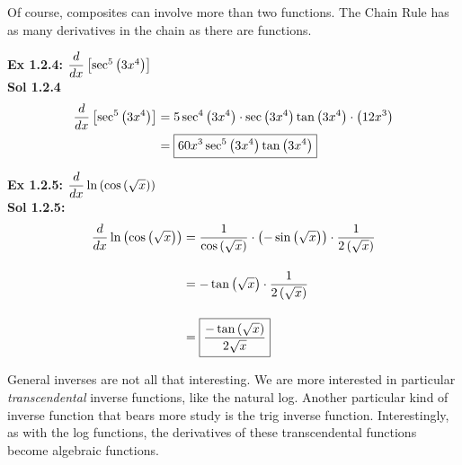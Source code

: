 Of course, composites can involve more than two functions. The Chain Rule has as many derivatives in the chain as there are functions. \par

\textbf{Ex 1.2.4: } $\dfrac{d}{dx} \left[\sec^5 \left(3x^4\right)\right]$ \\[11pt]
\textbf{Sol 1.2.4 } \begin{align*}
    \dfrac{d}{dx} \left[\sec^5 \left(3x^4\right)\right] & = 5\sec^4 \left(3x^4\right) \cdot \sec \left(3x^4\right) \tan \left(3x^4\right) \cdot \left(12x^3\right) \\
    & = \boxed{60x^3\sec^5 \left(3x^4\right)\tan \left(3x^4\right)}
\end{align*}

\textbf{Ex 1.2.5: } $\dfrac{d}{dx} \ln \left(\cos \left(\sqrt{x}\right)\right)$ \\[11pt]
\textbf{Sol 1.2.5: } \begin{align*}
    \dfrac{d}{dx} \ln \left(\cos \left(\sqrt{x}\right)\right) & = \dfrac{1}{\cos \left(\sqrt{x}\right)} \cdot \left(-\sin \left(\sqrt{x}\right)\right) \cdot \dfrac{1}{2\left(\sqrt{x}\right)} \\[11pt]
    & = -\tan \left(\sqrt{x}\right) \cdot \dfrac{1}{2\left(\sqrt{x}\right)} \\[11pt]
    & = \boxed{\dfrac{-\tan \left(\sqrt{x}\right)}{2\sqrt{x}}}
\end{align*}

General inverses are not all that interesting. We are more interested in particular \textit{transcendental} inverse functions, like the natural log. Another particular kind of inverse function that bears more study is the trig inverse function. Interestingly, as with the log functions, the derivatives of these transcendental functions become algebraic functions. \par

\begin{center}
\end{center}

